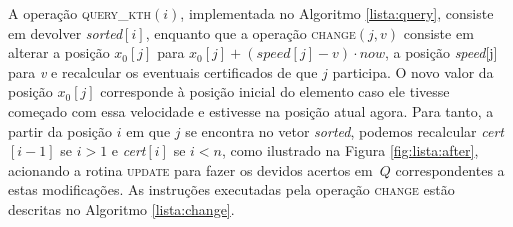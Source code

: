 A operação \textsc{query\_kth}$(i)$, implementada no Algoritmo
\ref{lista:query}, consiste em devolver \textit{sorted}$[i]$,
enquanto que a operação \textsc{change}$(j, v)$ consiste em alterar
a posição $x_0[j]$ para $x_0[j] + (\mathit{speed}[j] - v)\cdot now$,
a posição \textit{speed}[j] para \textit{v} e recalcular os
eventuais certificados de que $j$ participa. O novo valor da posição
$x_0[j]$ corresponde à posição inicial do elemento caso ele tivesse
começado com essa velocidade e estivesse na posição atual agora.
Para tanto, a partir da posição $i$ em que $j$ se encontra no vetor
\textit{sorted}, podemos recalcular \textit{cert}$[i - 1]$ se $i >
1$ e \textit{cert}$[i]$ se $i < n$, como ilustrado na Figura
\ref{fig:lista:after}, acionando a rotina \textsc{update} para fazer
os devidos acertos em~$Q$ correspondentes a estas modificações. As
instruções executadas pela operação \textsc{change} estão descritas
no Algoritmo \ref{lista:change}.


